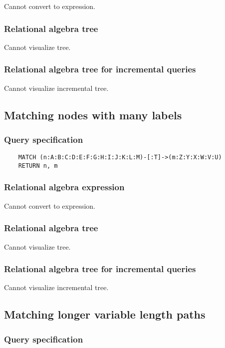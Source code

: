 	Cannot convert to expression.

	\subsubsection*{Relational algebra tree}

	Cannot visualize tree.

	\subsubsection*{Relational algebra tree for incremental queries}

	Cannot visualize incremental tree.
	\subsection{Matching nodes with many labels}

	\subsubsection*{Query specification}

	\begin{lstlisting}
	MATCH (n:A:B:C:D:E:F:G:H:I:J:K:L:M)-[:T]->(m:Z:Y:X:W:V:U)
	RETURN n, m
	\end{lstlisting}


	\subsubsection*{Relational algebra expression}

	Cannot convert to expression.

	\subsubsection*{Relational algebra tree}

	Cannot visualize tree.

	\subsubsection*{Relational algebra tree for incremental queries}

	Cannot visualize incremental tree.
	\subsection{Matching longer variable length paths}

	\subsubsection*{Query specification}

